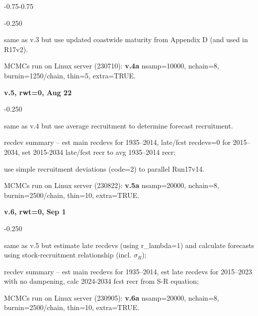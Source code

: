 \begin{itemize_csas}{-0.75}{-0.75}
	\begin{itemize_csas}{-0.25}{0}
		\item same as v.3 but use updated coastwide maturity from Appendix D (and used in R17v2).
		\item MCMCs run on Linux server (230710): \textbf{v.4a} nsamp=10000, nchain=8, burnin=1250/chain, thin=5, extra=TRUE.
	\end{itemize_csas}
	\item \textbf{v.5, rwt=0, Aug 22}
	\begin{itemize_csas}{-0.25}{0}
		\item same as v.4 but use average recruitment to determine forecast recruitment.
		\item recdev summary -- est main recdevs for 1935--2014, late/fcst recdevs=0 for 2015--2034, set 2015-2034 late/fcst recr to avg 1935--2014 recr;
		\item use simple recruitment deviations (code=2) to parallel Run17v14.
		\item MCMCs run on Linux server (230822): \textbf{v.5a} nsamp=20000, nchain=8, burnin=2500/chain, thin=10, extra=TRUE.
	\end{itemize_csas}
	\item \textbf{v.6, rwt=0, Sep 1}
	\begin{itemize_csas}{-0.25}{0}
		\item same as v.5 but estimate late recdevs (using r\_lambda=1) and calculate forecasts using stock-recruitment relationship (incl. $\sigma_R$);
		\item recdev summary -- est main recdevs for 1935--2014, est late recdevs for 2015--2023 with no dampening, calc 2024-2034 fcst recr from S-R equation;
		\item MCMCs run on Linux server (230905): \textbf{v.6a} nsamp=20000, nchain=8, burnin=2500/chain, thin=10, extra=TRUE.
	\end{itemize_csas}
\end{itemize_csas}

